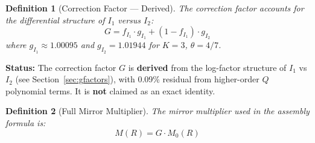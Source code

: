 \documentclass[11pt]{article}
\newtheorem{definition}{Definition}
\begin{document}
\begin{definition}[Correction Factor --- Derived]
\label{def:correction-factor}
The correction factor accounts for the differential structure of $I_1$ versus $I_2$:
\begin{equation}
G = f_{I_1} \cdot g_{I_1} + (1-f_{I_1}) \cdot g_{I_2}
\end{equation}
where $g_{I_1} \approx 1.00095$ and $g_{I_2} = 1.01944$ for $K=3$, $\theta=4/7$.
\end{definition}

\textbf{Status:} The correction factor $G$ is \textbf{derived} from the log-factor structure of $I_1$ vs $I_2$ (see Section~\ref{sec:gfactors}), with 0.09\% residual from higher-order $Q$ polynomial terms. It is \textbf{not} claimed as an exact identity.

\begin{definition}[Full Mirror Multiplier]
The mirror multiplier used in the assembly formula is:
\begin{equation}
\boxed{M(R) = G \cdot M_0(R)}
\end{equation}
\end{definition}
\end{document}
